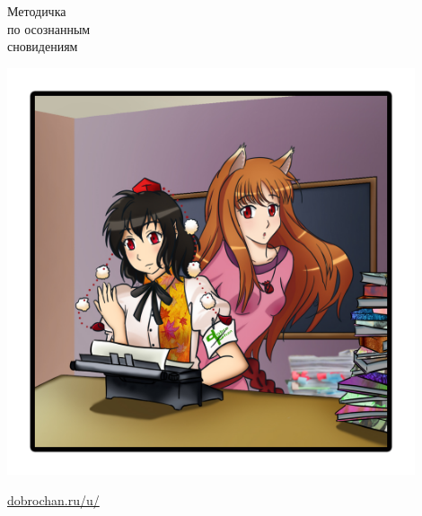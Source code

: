 \documentclass[a5paper,12pt,oneside]{memoir}
\begin{document}
\begin{titlingpage}



\begin{center}
 \begin{Huge}
   \fontsize{35}{35}\selectfont Методичка\\ по осознанным\\сновидениям\\
	\end{Huge}

\hspace{0.5cm}

\includegraphics[width=0.9\textwidth]{ex-titleillst.png}

\vfill

\normalsize

\url{dobrochan.ru/u/}

{\small{}}

\end{center}

\end{titlingpage}
\end{document}
